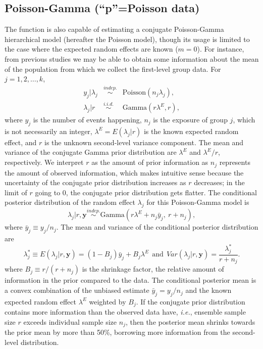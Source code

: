 \documentclass[article]{jss}
\begin{document}
\subsection[Poisson-Gamma]{Poisson-Gamma (``p''=Poisson data)}\label{poissonsubsec}
The function  is also capable of estimating a conjugate Poisson-Gamma hierarchical model (hereafter the Poisson model), though its usage is limited to the case where the expected random effects are known ($m=0$). For instance,  from previous studies we may be able to obtain some information about the mean of the population  from which we collect the first-level group data.  For $j=1, 2, \ldots, k$, 
\begin{eqnarray}
y_j\vert \lambda_j &\stackrel{indep.}{\sim} & \textrm{Poisson}(n_{j}\lambda_{j}),\\
\lambda_{j}\vert r &\stackrel{i.i.d.}{\sim}& \textrm{Gamma}(r\lambda^E, r),
\end{eqnarray}
where $y_j$ is the number of events happening, $n_{j}$ is the exposure of group $j$, which is not necessarily an integer, $\lambda^E=E(\lambda_j\vert r)$ is the known expected random effect, and $r$ is the unknown second-level variance component. The mean and variance of the conjugate Gamma prior distribution are $\lambda^E$ and $\lambda^E/r$, respectively. We interpret $r$ as the amount of prior information as $n_{j}$ represents the amount of observed information, which makes intuitive sense because the uncertainty of the conjugate prior distribution increases as $r$ decreases; in the limit of $r$ going to 0, the conjugate prior distribution gets flatter. The conditional posterior distribution of the random effect $\lambda_j$ for this Poisson-Gamma model is
\begin{equation} \label{gammapost}
\lambda_j\vert r, \boldsymbol{y} \stackrel{indep.}{\sim}\textrm{Gamma}(r\lambda^E + n_j\bar{y}_{j},~ r + n_j),
\end{equation}  
where $\bar{y}_j\equiv y_j/n_j$. The mean and variance of the conditional posterior distribution are
\begin{equation}\label{gammapost_mean_var}
\lambda^\ast_j\equiv E(\lambda_j\vert r, \boldsymbol{y} )=(1-B_{j})\bar{y}_{j} + B_{j}\lambda^E~~\textrm{and}~~Var(\lambda_j\vert r, \boldsymbol{y})=\frac{\lambda^\ast_j}{r+n_j}.
\end{equation}
where $B_{j}\equiv r / (r+n_{j})$ is the shrinkage factor, the relative amount of information in the prior compared to the data. The conditional posterior mean is  a convex combination of the unbiased estimate  $\bar{y}_{j} = y_j/n_j$ and the known expected random effect  $\lambda^E$ weighted by $B_j$. If the conjugate prior distribution contains more information than the observed data have, \emph{i.e.}, ensemble sample size $r$ exceeds individual sample size $n_{j}$, then the posterior mean shrinks  towards the prior mean by more than 50\%, borrowing more information from the second-level distribution. 
\end{document}
